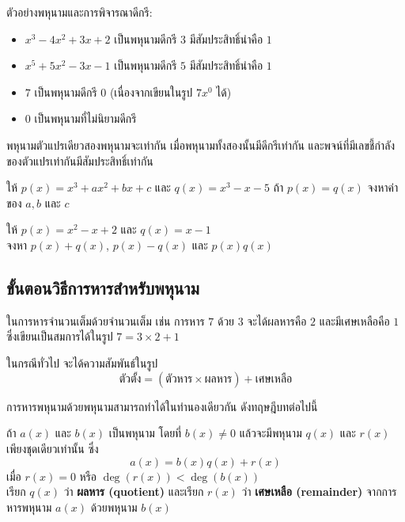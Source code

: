 \begin{examplebox}
	ตัวอย่างพหุนามและการพิจารณาดีกรี:
	\begin{itemize}
		\item $x^{3}-4 x^{2}+3 x+2$ เป็นพหุนามดีกรี $3$ มีสัมประสิทธิ์นำคือ $1$
		\item $x^{5}+5 x^{2}-3 x-1$ เป็นพหุนามดีกรี $5$ มีสัมประสิทธิ์นำคือ $1$
		\item $7$ เป็นพหุนามดีกรี $0$ (เนื่องจากเขียนในรูป $7x^0$ ได้)
		\item $0$ เป็นพหุนามที่ไม่นิยามดีกรี
	\end{itemize}    
\end{examplebox}

พหุนามตัวแปรเดียวสองพหุนามจะเท่ากัน เมื่อพหุนามทั้งสองนั้นมีดีกรีเท่ากัน และพจน์ที่มีเลขชี้กำลัง ของตัวแปรเท่ากันมีสัมประสิทธิ์เท่ากัน

\begin{examplebox}
	ให้ $p(x) = x^3 + ax^2 + bx + c$ และ $q(x) = x^3 - x - 5$ ถ้า $p(x) = q(x)$ จงหาค่าของ $a, b$ และ $c$
\end{examplebox}
\solution 

\newpage
\begin{examplebox}
	ให้ $p(x) = x^2 - x + 2$ และ $q(x) = x - 1$ \\
	จงหา $p(x) + q(x)$, $p(x) - q(x)$ และ $p(x)q(x)$
\end{examplebox}
\solution 

\newpage

\subsection{ขั้นตอนวิธีการหารสำหรับพหุนาม}

ในการหารจำนวนเต็มด้วยจำนวนเต็ม เช่น การหาร $7$ ด้วย $3$ จะได้ผลหารคือ $2$ และมีเศษเหลือคือ $1$ ซึ่งเขียนเป็นสมการได้ในรูป $7 = 3 \times 2 + 1$

ในกรณีทั่วไป จะได้ความสัมพันธ์ในรูป
\begin{equation*}
	\text{ตัวตั้ง} = (\text{ตัวหาร} \times \text{ผลหาร}) + \text{เศษเหลือ}
\end{equation*}

การหารพหุนามด้วยพหุนามสามารถทำได้ในทำนองเดียวกัน ดังทฤษฎีบทต่อไปนี้

\begin{theorembox} \label{thm1}
	ถ้า $a(x)$ และ $b(x)$ เป็นพหุนาม โดยที่ $b(x) \neq 0$ แล้วจะมีพหุนาม $q(x)$ และ $r(x)$ เพียงชุดเดียวเท่านั้น ซึ่ง
	\begin{equation*}
		a(x) = b(x)q(x) + r(x)
	\end{equation*}
	เมื่อ $r(x) = 0$ หรือ $\operatorname{deg}(r(x)) < \operatorname{deg}(b(x))$
	\\[0.5em]
	เรียก $q(x)$ ว่า \textbf{ผลหาร (quotient)} และเรียก $r(x)$ ว่า \textbf{เศษเหลือ (remainder)} จากการหารพหุนาม $a(x)$ ด้วยพหุนาม $b(x)$
\end{theorembox}

